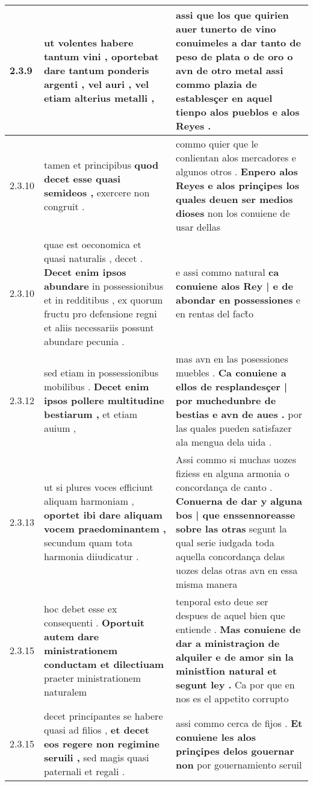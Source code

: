 \begin{tabular}{|p{1cm}|p{6.5cm}|p{6.5cm}|}
2.3.9 & ut volentes habere tantum vini , \textbf{ oportebat dare tantum ponderis argenti , vel auri , } vel etiam alterius metalli , & assi que los que quirien auer tunerto de vino \textbf{ conuimeles a dar tanto de peso de plata o de oro o avn de otro metal } assi commo plazia de establesçer en aquel tienpo alos pueblos e alos Reyes . \\\hline
2.3.10 & tamen et principibus \textbf{ quod decet esse quasi semideos , } exercere non congruit . & commo quier que le conlientan alos mercadores e algunos otros . \textbf{ Enpero alos Reyes e alos prinçipes los quales deuen ser medios dioses } non los conuiene de usar dellas \\\hline
2.3.10 & quae est oeconomica et quasi naturalis , decet . \textbf{ Decet enim ipsos abundare } in possessionibus et in redditibus , ex quorum fructu pro defensione regni et aliis necessariis possunt abundare pecunia . & e assi commo natural \textbf{ ca conuiene alos Rey | e de abondar en possessiones } e en rentas del fact̃o \\\hline
2.3.12 & sed etiam in possessionibus mobilibus . \textbf{ Decet enim ipsos pollere multitudine bestiarum , } et etiam auium , & mas avn en las posessiones muebles . \textbf{ Ca conuiene a ellos de resplandesçer | por muchedunbre de bestias e avn de aues . } por las quales pueden satisfazer ala mengua dela uida . \\\hline
2.3.13 & ut si plures voces efficiunt aliquam harmoniam , \textbf{ oportet ibi dare aliquam vocem praedominantem , } secundum quam tota harmonia diiudicatur . & Assi commo si muchas uozes fiziess en alguna armonia o concordança de canto . \textbf{ Conuerna de dar y alguna bos | que enssennoreasse sobre las otras } segunt la qual serie iudgada toda aquella concordança delas uozes delas otras avn en essa misma manera \\\hline
2.3.15 & hoc debet esse ex consequenti . \textbf{ Oportuit autem dare ministrationem conductam et dilectiuam } praeter ministrationem naturalem & tenporal esto deue ser despues de aquel bien que entiende . \textbf{ Mas conuiene de dar a ministraçion de alquiler e de amor sin la ministt̃ion natural et segunt ley . } Ca por que en nos es el appetito corrupto \\\hline
2.3.15 & decet principantes se habere quasi ad filios , \textbf{ et decet eos regere non regimine seruili , } sed magis quasi paternali et regali . & assi commo cerca de fijos . \textbf{ Et conuiene les alos prinçipes delos gouernar non } por gouernamiento seruil \\\hline

\end{tabular}

